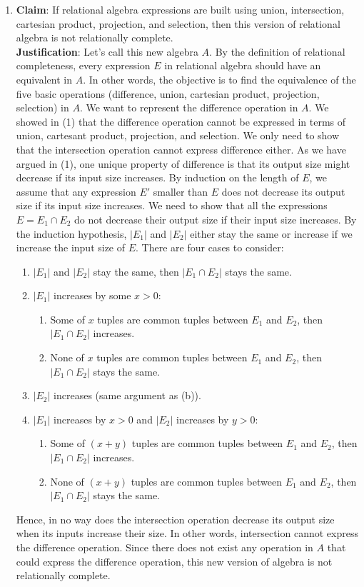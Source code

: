 \begin{enumerate}
  \item \textbf{Claim}: If relational algebra expressions are built using union, intersection, cartesian product, 
  projection, and selection, then this version of relational algebra is not relationally complete. \\
  \textbf{Justification}: Let's call this new algebra $A$. By the definition of relational completeness, every expression $E$ in 
  relational algebra should have an equivalent in $A$. In other words, the objective is to find the equivalence of the five basic 
  operations (difference, union, cartesian product, projection, selection) in $A$. We want to represent the difference operation 
  in $A$. We showed in (1) that the difference operation cannot be expressed in terms of union, cartesant product, projection, and 
  selection. We only need to show that the intersection operation cannot express difference either. As we have argued in (1), one unique 
  property of difference is that its output size might decrease if its input size increases. By induction on the 
  length of $E$, we assume that any expression $E'$ smaller than $E$ does not decrease its output size if its input size increases. 
  We need to show that all the expressions $E = E_1 \cap E_2$ do not decrease their output size if their input size increases. 
  By the induction hypothesis, $|E_1|$ and $|E_2|$ either stay the same or increase if we increase the input size of $E$. There are four 
  cases to consider: 
  \begin{enumerate}
    \item $|E_1|$ and $|E_2|$ stay the same, then $|E_1 \cap E_2|$ stays the same.
    \item $|E_1|$ increases by some $x > 0$: 
    \begin{enumerate}
      \item Some of $x$ tuples are common tuples between $E_1$ and $E_2$, then $|E_1 \cap E_2|$ increases. 
      \item None of $x$ tuples are common tuples between $E_1$ and $E_2$, then $|E_1 \cap E_2|$ stays the same.
    \end{enumerate}
    \item $|E_2|$ increases (same argument as (b)).
    \item $|E_1|$ increases by $x > 0$ and $|E_2|$ increases by $y > 0$:
    \begin{enumerate}
      \item Some of $(x + y)$ tuples are common tuples between $E_1$ and $E_2$, then $|E_1 \cap E_2|$ increases. 
      \item None of $(x + y)$ tuples are common tuples between $E_1$ and $E_2$, then $|E_1 \cap E_2|$ stays the same.
    \end{enumerate}
  \end{enumerate}
  Hence, in no way does the intersection operation decrease its output size when its inputs increase their size. 
  In other words, intersection cannot express the difference operation. Since there does not exist any operation in $A$ that 
  could express the difference operation, this new version of algebra is not relationally complete. 


\end{enumerate}

